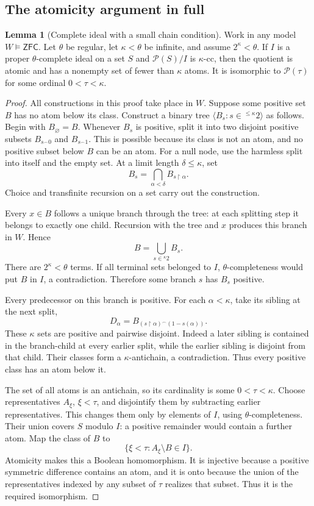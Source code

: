 \documentclass[11pt,letterpaper]{article}
\theoremstyle{definition}
\newtheorem{lemma}[definition]{Lemma}
\numberwithin{equation}{section}
\newcommand{\ZFC}{\mathsf{ZFC}}
\newcommand{\Pow}{\mathcal P}
\newcommand{\restr}{\mathbin{\upharpoonright}}
\begin{document}
\subsection{The atomicity argument in full}

\begin{lemma}[Complete ideal with a small chain condition]\label{lem:atomic}
Work in any model $W\models\ZFC$. Let $\theta$ be regular, let $\kappa<\theta$ be infinite, and assume $2^\kappa<\theta$. If $I$ is a proper $\theta$-complete ideal on a set $S$ and $\Pow(S)/I$ is $\kappa$-cc, then the quotient is atomic and has a nonempty set of fewer than $\kappa$ atoms. It is isomorphic to $\Pow(\tau)$ for some ordinal $0<\tau<\kappa$.
\end{lemma}

\begin{proof}
All constructions in this proof take place in $W$. Suppose some positive set $B$ has no atom below its class. Construct a binary tree $\langle B_s:s\in{}^{\leq\kappa}2\rangle$ as follows. Begin with $B_\varnothing=B$. Whenever $B_s$ is positive, split it into two disjoint positive subsets $B_{s^\frown0}$ and $B_{s^\frown1}$. This is possible because its class is not an atom, and no positive subset below $B$ can be an atom. For a null node, use the harmless split into itself and the empty set. At a limit length $\delta\leq\kappa$, set
\[
B_s=\bigcap_{\alpha<\delta}B_{s\restr\alpha}.
\]
Choice and transfinite recursion on a set carry out the construction.

Every $x\in B$ follows a unique branch through the tree: at each splitting step it belongs to exactly one child. Recursion with the tree and $x$ produces this branch in $W$. Hence
\[
B=\bigcup_{s\in{}^\kappa2}B_s.
\]
There are $2^\kappa<\theta$ terms. If all terminal sets belonged to $I$, $\theta$-completeness would put $B$ in $I$, a contradiction. Therefore some branch $s$ has $B_s$ positive.

Every predecessor on this branch is positive. For each $\alpha<\kappa$, take its sibling at the next split,
\[
D_\alpha=B_{(s\restr\alpha)^\frown(1-s(\alpha))}.
\]
These $\kappa$ sets are positive and pairwise disjoint. Indeed a later sibling is contained in the branch-child at every earlier split, while the earlier sibling is disjoint from that child. Their classes form a $\kappa$-antichain, a contradiction. Thus every positive class has an atom below it.

The set of all atoms is an antichain, so its cardinality is some $0<\tau<\kappa$. Choose representatives $A_\xi$, $\xi<\tau$, and disjointify them by subtracting earlier representatives. This changes them only by elements of $I$, using $\theta$-completeness. Their union covers $S$ modulo $I$: a positive remainder would contain a further atom. Map the class of $B$ to
\[
\{\xi<\tau:A_\xi\setminus B\in I\}.
\]
Atomicity makes this a Boolean homomorphism. It is injective because a positive symmetric difference contains an atom, and it is onto because the union of the representatives indexed by any subset of $\tau$ realizes that subset. Thus it is the required isomorphism.
\end{proof}
\end{document}
